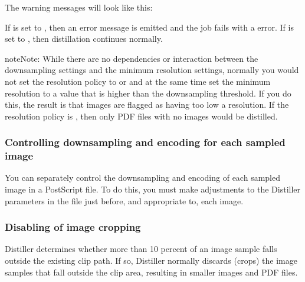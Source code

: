 \documentclass[letterpaper,12pt,english,openany,oneside]{sphinxmanual}
\begin{document}
The warning messages will look like this:

\begin{sphinxVerbatim}[commandchars=\\\{\}]
\PYG{p}{[}       

       \PYG{p}{]}
\end{sphinxVerbatim}

If  is set to  , then an error message is emitted and the job fails with a  error. If  is set to  , then distillation continues normally.

\begin{sphinxadmonition}{note}{Note:}
While there are no dependencies or interaction between the downsampling settings and the minimum resolution settings, normally you would not set the resolution policy to  or  and at the same time set the minimum resolution to a value that is higher than the downsampling threshold. If you do this, the result is that  images are flagged as having too low a resolution. If the resolution policy is  , then only PDF files with no images would be distilled.
\end{sphinxadmonition}




\subsubsection{Controlling downsampling and encoding for each sampled image}
\label{\detokenize{PDF_Create_UsingSettings:controlling-downsampling-and-encoding-for-each-sampled-image}}
You can separately control the downsampling and encoding of each sampled image in a PostScript file. To do this, you must make adjustments to the Distiller parameters in the file just before, and appropriate to, each image.




\subsubsection{Disabling of image cropping}
\label{\detokenize{PDF_Create_UsingSettings:disabling-of-image-cropping}}
Distiller determines whether more than 10 percent of an image sample falls outside the existing clip path. If so, Distiller normally discards (crops) the image samples that fall outside the clip area, resulting in smaller images and PDF files.
\end{document}
